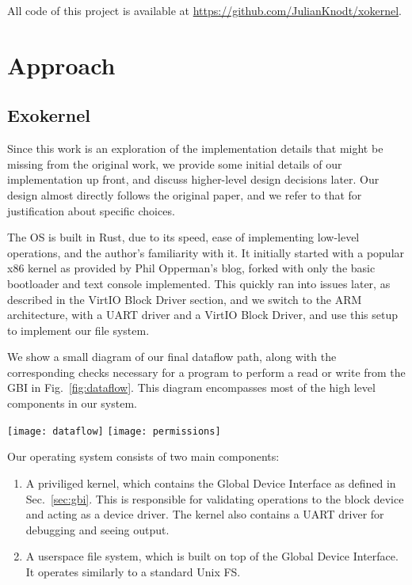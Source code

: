 \documentclass[letterpaper,twocolumn,10pt]{article}
\begin{document}
All code of this project is available at \url{https://github.com/JulianKnodt/xokernel}.
\section{Approach}
\subsection{Exokernel}

Since this work is an exploration of the implementation details that might be missing from
the original work, we provide some initial details of our implementation up front, and discuss
higher-level design decisions later. Our design almost directly follows the original paper, and
we refer to that for justification about specific choices.

The OS is built in Rust, due to its speed, ease of implementing low-level operations, and the
author's familiarity with it. It initially started with a popular x86 kernel as provided by Phil
Opperman's blog, forked with only the basic bootloader and text console implemented. This
quickly ran into issues later, as described in the VirtIO Block Driver section, and we switch to
the ARM architecture, with a UART driver and a VirtIO Block Driver, and use this setup
to implement our file system.

We show a small diagram of our final dataflow path, along with the corresponding checks
necessary for a program to perform a read or write from the GBI in Fig.~\ref{fig:dataflow}. This
diagram encompasses most of the high level components in our system.

\begin{figure*}
  \centering
  \texttt{[image: dataflow]}
  \texttt{[image: permissions]}
  \caption{
    Flow of data in our system. The GBI has unrestricted access to blocks, but only provides
    them to users who have ensured sole ownership through its interface. The flowchart describes
    the procedure for any program to request ownership of blocks in our system, which is
    relatively straightforward and is only necessary upon initialization of a new program that
    requires direct block access.
  }
  \label{fig:dataflow}
\end{figure*}

Our operating system consists of two main components:
\begin{enumerate}
  \item A priviliged kernel, which contains the Global Device Interface as defined in
  Sec.~\ref{sec:gbi}. This is responsible for validating operations to the block device and
  acting as a device driver. The kernel also contains a UART driver for debugging and seeing
  output.

  \item A userspace file system, which is built on top of the Global Device Interface. It
  operates similarly to a standard Unix FS.
\end{enumerate}
\end{document}
